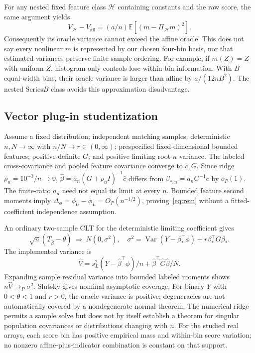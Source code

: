 \documentclass{article}
\newcommand{\E}{\mathbb{E}}
\newcommand{\Var}{\operatorname{Var}}
\begin{document}
For any nested fixed feature class $\mathcal H$ containing constants and the raw score, the same argument yields
\[
 V_{\mathcal H}-V_{\mathrm{all}}=(a/n)\E[(m-\Pi_{\mathcal H}m)^2].
\]
Consequently its oracle variance cannot exceed the affine oracle. This does not say every nonlinear $m$ is represented by our chosen four-bin basis, nor that estimated variances preserve finite-sample ordering. For example, if $m(Z)=Z$ with uniform $Z$, histogram-only controls lose within-bin information. With $B$ equal-width bins, their oracle variance is larger than affine by $a/(12nB^2)$. The nested Series$B$ class avoids this approximation disadvantage.

\subsection{Vector plug-in studentization}
Assume a fixed distribution; independent matching samples; deterministic $n,N\to\infty$ with $n/N\to r\in(0,\infty)$; prespecified fixed-dimensional bounded features; positive-definite $G$; and positive limiting root-$n$ variance. The labeled cross-covariance and pooled feature covariance converge to $c,G$. Since ridge $\rho_n=10^{-3}/n\to0$, $\widehat\beta=a_n(\widehat G+\rho_n I)^{-1}\widehat c$ differs from $\beta_{*,n}=a_nG^{-1}c$ by $o_P(1)$. The finite-ratio $a_n$ need not equal its limit at every $n$. Bounded feature second moments imply $\Delta_\phi=\overline\phi_U-\overline\phi_L=O_P(n^{-1/2})$, proving~\eqref{eq:rem} without a fitted-coefficient independence assumption.

An ordinary two-sample CLT for the deterministic limiting coefficient gives
\[
 \sqrt n(T_{\widehat\beta}-\theta)\ \Rightarrow\
 N(0,\sigma^2),\quad
 \sigma^2=\Var(Y-\beta_*^\top\phi)+r\beta_*^\top G\beta_*.
\]
The implemented variance is
\[
 \widehat V=s_L^2(Y-\widehat\beta^\top\phi)/n+
                   \widehat\beta^\top\widehat G\widehat\beta/N.
\]
Expanding sample residual variance into bounded labeled moments shows $n\widehat V\to_P\sigma^2$. Slutsky gives nominal asymptotic coverage. For binary $Y$ with $0<\theta<1$ and $r>0$, the oracle variance is positive; degeneracies are not automatically covered by a nondegenerate normal theorem. The numerical ridge permits a sample solve but does not by itself establish a theorem for singular population covariances or distributions changing with $n$. For the studied real arrays, each score bin has positive empirical mass and within-bin score variation; no nonzero affine-plus-indicator combination is constant on that support.
\end{document}
